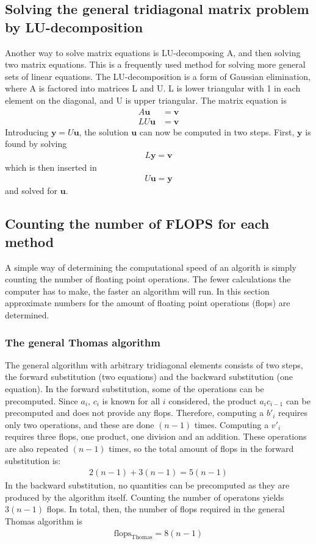 \documentclass[aps,reprint]{revtex4-1}
\begin{document}
\subsection{Solving the general tridiagonal matrix problem by LU-decomposition}
Another way to solve matrix equations is LU-decomposing A, and then solving
two matrix equations. This is a frequently used method for solving more general
sets of linear equations. The LU-decomposition is a form of Gaussian elimination,
where A is factored into matrices L and U. L is lower triangular with 1 in each
element on the diagonal, and U is upper triangular. The matrix equation is
\begin{align*}
  A\mathbf{u} &= \mathbf{v} \\
  LU \mathbf{u} &= \mathbf{v}
\end{align*}
Introducing $\mathbf{y} = U\mathbf{u}$, the solution $\mathbf{u}$ can now be
computed in two steps. First, $\mathbf{y}$ is found by solving
\begin{align*}
  L\mathbf{y} = \mathbf{v}
\end{align*}
which is then inserted in
\begin{align*}
  U\mathbf{u} = \mathbf{y}
\end{align*}
and solved for $\mathbf{u}$.

\subsection{Counting the number of FLOPS for each method}
A simple way of determining the computational speed of an algorith is simply
counting the number of floating point operations. The fewer calculations the
computer has to make, the faster an algorithm will run. In this section approximate numbers
for the amount of floating point operations (flops) are determined.
\subsubsection{The general Thomas algorithm}
The general algorithm with arbitrary tridiagonal elements consists of two steps,
the forward substitution (two equations) and the backward substitution (one equation).
In the forward substitution, some of the operations can be precomputed. Since
$a_i$, $c_i$ is known for all $i$ considered, the product
$a_i c_{i-1}$ can be precomputed and does not provide any flops.
Therefore, computing a $b'_i$ requires only two operations, and
these are done $(n-1)$ times. Computing a $v'_i$ requires three flops, one
product, one division and an addition. These operations are also repeated $(n-1)$ times,
so the total amount of flops in the forward substitution is:
\begin{align*}
  2(n-1) + 3(n-1) = 5(n-1)
\end{align*}
In the backward substitution, no quantities can be precomputed as they are
produced by the algorithm itself. Counting the number of operatons yields $3(n-1)$ flops.
In total, then, the number of flops required in the general Thomas algorithm is
\begin{align*}
  \text{flops}_\text{Thomas} = 8(n-1)
\end{align*}
\end{document}
